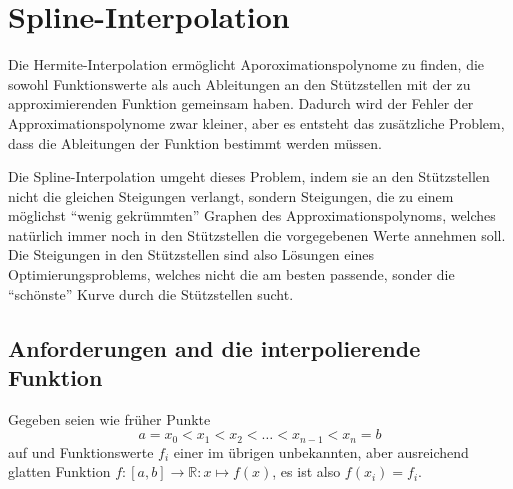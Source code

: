 %
%
%

\section{Spline-Interpolation
\label{buch:section:spline}}
Die Hermite-Interpolation ermöglicht Aporoximationspolynome zu finden,
die sowohl Funktionswerte als auch Ableitungen an den Stützstellen mit
der zu approximierenden Funktion gemeinsam haben.
Dadurch wird der Fehler der Approximationspolynome zwar kleiner, aber
es entsteht das zusätzliche Problem, dass die Ableitungen der
Funktion bestimmt werden müssen.

Die Spline-Interpolation umgeht dieses Problem, indem sie an den
Stützstellen nicht die gleichen Steigungen verlangt, sondern Steigungen,
die zu einem möglichst ``wenig gekrümmten'' Graphen des Approximationspolynoms,
welches natürlich immer noch in den Stützstellen die vorgegebenen Werte
annehmen soll.
Die Steigungen in den Stützstellen sind also Lösungen eines
Optimierungsproblems, welches nicht die am besten passende, sonder
die ``schönste'' Kurve durch die Stützstellen sucht.

\subsection{Anforderungen and die interpolierende Funktion
\label{buch:subsection:anforderungen}}
Gegeben seien wie früher Punkte
\[
a=x_0< x_1 < x_2< \dots < x_{n-1} < x_n = b
\]
auf und Funktionswerte $f_i$ einer im übrigen unbekannten, aber 
ausreichend glatten Funktion $f\colon [a,b]\to\mathbb R:x\mapsto f(x)$,
es ist also $f(x_i)=f_i$.

